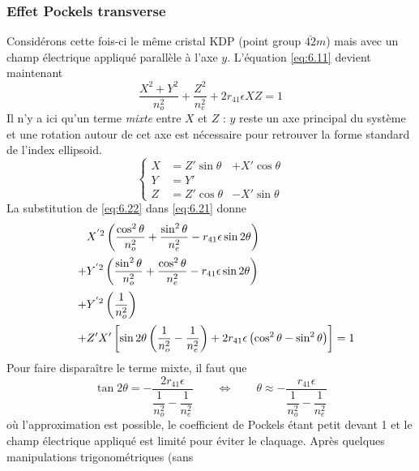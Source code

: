 \subsubsection{Effet Pockels transverse}
Considérons cette fois-ci le même cristal KDP (point group $\bar{42}m$) mais avec un champ électrique
appliqué parallèle à l'axe $y$. L'équation \eqref{eq:6.11} devient maintenant
\begin{equation}
\dfrac{X^2+Y^2}{n_o^2}+\dfrac{Z^2}{n_e^2}+2r_{41}\epsilon XZ = 1
\label{eq:6.21}
\end{equation}
Il n'y a ici qu'un terme \textit{mixte} entre $X$ et $Z$ : $y$ reste un axe principal du système et une
rotation autour de cet axe est nécessaire pour retrouver la forme standard de l'index ellipsoid.
\begin{equation}
\left\{\begin{array}{lll}
X&=Z'\sin\theta&+X'\cos\theta\\
Y&=Y'\\
Z&=Z'\cos\theta&-X'\sin\theta
\end{array}\right.
\label{eq:6.22}
\end{equation}
La substitution de \eqref{eq:6.22} dans \eqref{eq:6.21} donne
\begin{equation}
\begin{array}{ll}
&\phantom{+}\DS X^{'2}\left(\dfrac{\cos^2\theta}{n_o^2}+\dfrac{\sin^2\theta}{n_e^2}-r_{41}\epsilon\sin2\theta\right)\vspace{2mm}\\
&+\DS Y^{'2}\left(\dfrac{\sin^2\theta}{n_o^2}+\dfrac{\cos^2\theta}{n_e^2}-r_{41}\epsilon\sin2\theta\right)\vspace{2mm}\\
&+\DS Y^{'2}\left(\dfrac{1}{n_o^2}\right)\vspace{2mm}\\
&+\DS Z'X'\left[\sin2\theta\left(\dfrac{1}{n_o^2}-\dfrac{1}{n_e^2}\right)+2r_{41}\epsilon\left(\cos^2\theta
-\sin^2\theta\right)\right]=1
\end{array}
\end{equation}
Pour faire disparaître le terme mixte, il faut que
\begin{equation}
\tan2\theta=-\dfrac{2r_{41}\epsilon}{\dfrac{1}{n_o^2}-\dfrac{1}{n_e^2}}\qquad\Leftrightarrow\qquad
\theta\approx -\dfrac{r_{41}\epsilon}{\dfrac{1}{n_o^2}-\dfrac{1}{n_e^2}}
\end{equation}
où l'approximation est possible, le coefficient de Pockels étant petit devant 1 et le champ électrique
appliqué est limité pour éviter le claquage. Après quelques manipulations trigonométriques (sans 
